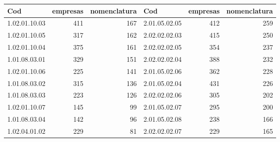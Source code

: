 \begin{table}[ht]
\centering
\begin{tabular}{lrrlrr}
  \hline
Cod & empresas & nomenclatura & Cod & empresas & nomenclatura \\ 
  \hline
1.02.01.10.03 & 411 & 167 & 2.01.05.02.05 & 412 & 259 \\ 
  1.02.01.10.05 & 317 & 162 & 2.02.02.02.03 & 415 & 250 \\ 
  1.02.01.10.04 & 375 & 161 & 2.02.02.02.05 & 354 & 237 \\ 
  1.01.08.03.01 & 329 & 151 & 2.02.02.02.04 & 388 & 232 \\ 
  1.02.01.10.06 & 225 & 141 & 2.01.05.02.06 & 362 & 228 \\ 
  1.01.08.03.02 & 315 & 136 & 2.01.05.02.04 & 431 & 226 \\ 
  1.01.08.03.03 & 223 & 126 & 2.02.02.02.06 & 305 & 202 \\ 
  1.02.01.10.07 & 145 &  99 & 2.01.05.02.07 & 295 & 200 \\ 
  1.01.08.03.04 & 142 &  96 & 2.01.05.02.08 & 238 & 166 \\ 
  1.02.04.01.02 & 229 &  81 & 2.02.02.02.07 & 229 & 165 \\ 
   \hline
\end{tabular}
\end{table}

